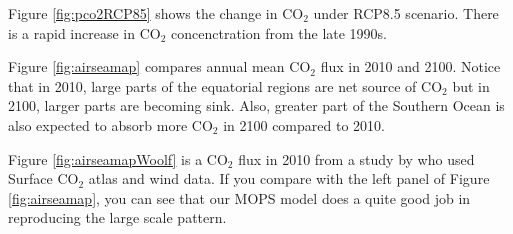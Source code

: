 \documentclass[a4paper]{article}
\def\CO{$\mathrm{CO_{2}}$ }
\begin{document}
\begin{enumerate}
Figure \ref{fig:pco2RCP85} shows the change in $\mathrm{CO_2}$ under RCP8.5 scenario. There is a rapid increase in \CO concenctration from the late 1990s. 

Figure \ref{fig:airseamap} compares annual mean $\mathrm{CO_2}$ flux in 2010 and 2100. Notice that in 2010, large parts of the equatorial regions are net source of $\mathrm{CO_2}$ but in 2100, larger parts are becoming sink. Also, greater part of the Southern Ocean is also expected to absorb more  $\mathrm{CO_2}$ in 2100 compared to 2010. 

Figure \ref{fig:airseamapWoolf} is a $\mathrm{CO_2}$ flux in 2010 from a study by \cite{Woolf19} who used Surface $\mathrm{CO_2}$ atlas and wind data. If you compare with the left panel of Figure  \ref{fig:airseamap}, you can see that our MOPS model does a quite good job in reproducing the large scale pattern.


\end{enumerate}
\end{document}
